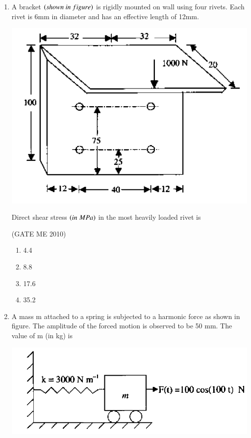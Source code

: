 \documentclass[journal,12pt,onecolumn]{IEEEtran}
\theoremstyle{remark}
\begin{document}
\begin{enumerate}
\item A bracket $\brak{shown\ in\ figure}$ is rigidly mounted on wall using four rivets. Each rivet is 6mm in diameter and has an effective length of 12mm.
\begin{center}
    \includegraphics[width=0.7\linewidth]{figs/fig1.png}
\end{center}
Direct shear stress $\left(in\;MPa\right)$ in the most heavily loaded rivet is 


  \hfill{(GATE ME 2010)}\\

\begin{multicols}{4}
\begin{enumerate}
\item 4.4
\item 8.8
\item 17.6
\item 35.2
\end{enumerate}
\end{multicols}



\item A mass m attached to a spring is subjected to a harmonic force as shown in figure. The amplitude of the forced motion is observed to be 50 mm. The value of m (in kg) is
\begin{center}
\includegraphics[width=\linewidth=0.7]{figs/fig2.png} 
\end{center}


\end{enumerate}
\end{document}
